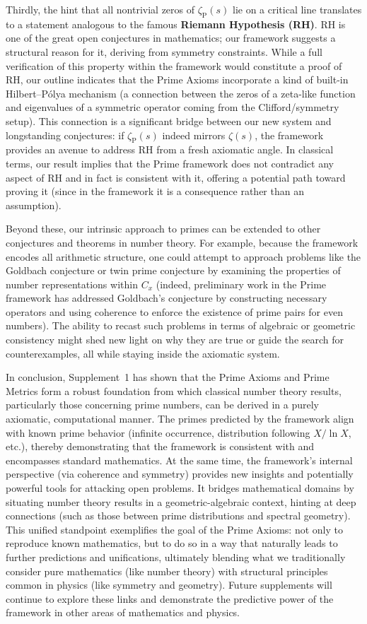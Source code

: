 \documentclass[11pt]{article}
\begin{document}
Thirdly, the hint that all nontrivial zeros of $\zeta_{\mathrm{P}}(s)$ lie on a critical line translates to a statement analogous to the famous \textbf{Riemann Hypothesis (RH)}. RH is one of the great open conjectures in mathematics; our framework suggests a structural reason for it, deriving from symmetry constraints. While a full verification of this property within the framework would constitute a proof of RH, our outline indicates that the Prime Axioms incorporate a kind of built-in Hilbert–Pólya mechanism (a connection between the zeros of a zeta-like function and eigenvalues of a symmetric operator coming from the Clifford/symmetry setup). This connection is a significant bridge between our new system and longstanding conjectures: if $\zeta_{\mathrm{P}}(s)$ indeed mirrors $\zeta(s)$, the framework provides an avenue to address RH from a fresh axiomatic angle. In classical terms, our result implies that the Prime framework does not contradict any aspect of RH and in fact is consistent with it, offering a potential path toward proving it (since in the framework it is a consequence rather than an assumption).

Beyond these, our intrinsic approach to primes can be extended to other conjectures and theorems in number theory. For example, because the framework encodes all arithmetic structure, one could attempt to approach problems like the Goldbach conjecture or twin prime conjecture by examining the properties of number representations within $C_x$ (indeed, preliminary work in the Prime framework has addressed Goldbach’s conjecture by constructing necessary operators and using coherence to enforce the existence of prime pairs for even numbers). The ability to recast such problems in terms of algebraic or geometric consistency might shed new light on why they are true or guide the search for counterexamples, all while staying inside the axiomatic system.

In conclusion, Supplement 1 has shown that the Prime Axioms and Prime Metrics form a robust foundation from which classical number theory results, particularly those concerning prime numbers, can be derived in a purely axiomatic, computational manner. The primes predicted by the framework align with known prime behavior (infinite occurrence, distribution following $X/\ln X$, etc.), thereby demonstrating that the framework is consistent with and encompasses standard mathematics. At the same time, the framework’s internal perspective (via coherence and symmetry) provides new insights and potentially powerful tools for attacking open problems. It bridges mathematical domains by situating number theory results in a geometric-algebraic context, hinting at deep connections (such as those between prime distributions and spectral geometry). This unified standpoint exemplifies the goal of the Prime Axioms: not only to reproduce known mathematics, but to do so in a way that naturally leads to further predictions and unifications, ultimately blending what we traditionally consider pure mathematics (like number theory) with structural principles common in physics (like symmetry and geometry). Future supplements will continue to explore these links and demonstrate the predictive power of the framework in other areas of mathematics and physics.
\end{document}
